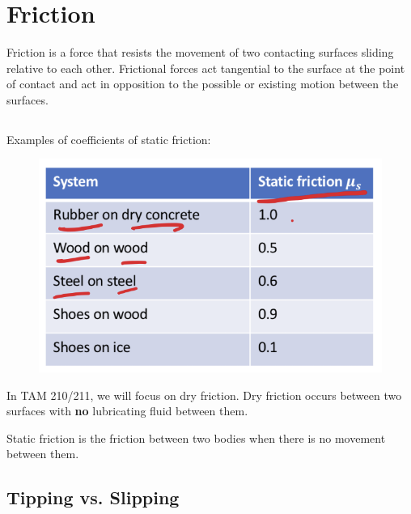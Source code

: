 \section{Friction}

Friction is a force that resists the movement of two contacting surfaces sliding relative to each other. Frictional forces act tangential to the surface at the point of contact and act in opposition to the possible or existing motion between the surfaces. 


\subsection{}

Examples of coefficients of static friction: 

\begin{figure}[!h]
\centering
\includegraphics[angle=0, width=3 in]{FrictionFigures/ExampleCoeff.png}
\vspace{-2mm}
\caption{\small {}}
\vspace{-3mm}
\label{Fig:ExampleCoeff}
\end{figure}


In TAM 210/211, we will focus on dry friction. Dry friction occurs between two surfaces with \textbf{no} lubricating fluid between them. 

Static friction is the friction between two bodies when there is no movement between them. 

\subsection{Tipping vs. Slipping}

